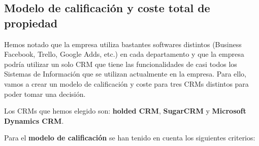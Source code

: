 \documentclass{article}
\begin{document}
\subsection{Modelo de calificación y coste total de propiedad}

Hemos notado que la empresa utiliza bastantes softwares distintos (Business Facebook, Trello, Google Adds, etc.) en cada departamento y que la empresa podría utilizar un solo CRM que tiene las funcionalidades de casi todos los Sistemas de Información que se utilizan actualmente en la empresa. Para ello, vamos a crear un modelo de calificación y coste para tres CRMs distintos para poder tomar una decisión. 

Los CRMs que hemos elegido son: \textbf{holded CRM}, \textbf{SugarCRM} y \textbf{Microsoft Dynamics CRM}. 

Para el \textbf{modelo de calificación} se han tenido en cuenta los siguientes criterios: 
\end{document}
